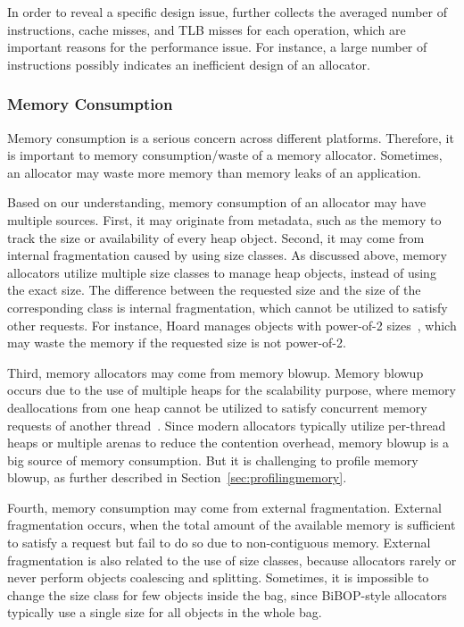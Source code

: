 In order to reveal a specific design issue, \MP{} further collects the averaged number of instructions, cache misses, and TLB misses for each operation, which are important reasons for the performance issue. For instance, a large number of instructions possibly indicates an inefficient design of an allocator. 

\subsubsection{Memory Consumption}
\label{sec:memoryconsumption}

Memory consumption is a serious concern across different platforms. Therefore, it is important to memory consumption/waste of a memory allocator. Sometimes, an allocator may waste more memory than memory leaks of an application. 

Based on our understanding, memory consumption of an allocator may have multiple sources. First, it may originate from metadata, such as the memory to track the size or availability of every heap object. Second, it may come from internal fragmentation caused by using size classes. 
 As discussed above, memory allocators utilize multiple size classes to manage heap objects, instead of using the exact size. The difference between the requested size and the size of the corresponding class is internal fragmentation, which cannot be utilized to satisfy other requests. For instance, Hoard manages objects with power-of-2 sizes~\citep{Hoard}, which may waste the memory if the requested size is not power-of-2. 
 
Third, memory allocators may come from memory blowup. Memory blowup occurs due to the use of multiple heaps for the scalability purpose, where memory deallocations from one heap cannot be utilized to satisfy  concurrent memory requests of another thread~\cite{Hoard}. 
Since modern allocators typically utilize per-thread heaps or multiple arenas to reduce the contention overhead, memory blowup is a big source of memory consumption. But it is challenging to profile memory blowup, as further described in Section~\ref{sec:profilingmemory}.   

Fourth, memory consumption may come from external fragmentation. External fragmentation occurs, when the total amount of the available memory is sufficient to satisfy a request but fail to do so due to non-contiguous memory. External fragmentation is also related to the use of size classes, because allocators rarely or never perform objects coalescing and splitting.
Sometimes, it is impossible to change the size class for few objects inside the bag, since BiBOP-style allocators typically use a single size for all objects in the whole bag. 

